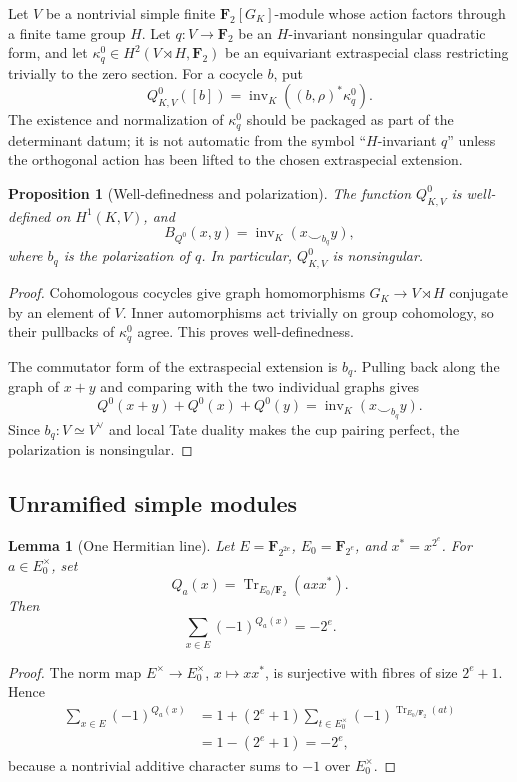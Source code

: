 \documentclass[11pt,reqno]{amsart}
\newtheorem{proposition}[theorem]{Proposition}
\newtheorem{lemma}[theorem]{Lemma}
\theoremstyle{remark}
\numberwithin{equation}{section}
\newcommand{\F}{\mathbf F}
\newcommand{\inv}{\operatorname{inv}}
\newcommand{\Tr}{\operatorname{Tr}}
\begin{document}
Let \(V\) be a nontrivial simple finite \(\F_2[G_K]\)-module whose action
factors through a finite tame group \(H\).  Let
\(q:V\to\F_2\) be an \(H\)-invariant nonsingular quadratic form, and let
\(\kappa_q^0\in H^2(V\rtimes H,\F_2)\) be an equivariant extraspecial
class restricting trivially to the zero section.  For a cocycle \(b\), put
\[
 Q^0_{K,V}([b])=\inv_K((b,\rho)^*\kappa_q^0).
\]
The existence and normalization of \(\kappa_q^0\) should be packaged as
part of the determinant datum; it is not automatic from the symbol
``\(H\)-invariant \(q\)'' unless the orthogonal action has been lifted to
the chosen extraspecial extension.

\begin{proposition}[Well-definedness and polarization]
\label{prop:local-polar}
The function \(Q^0_{K,V}\) is well-defined on \(H^1(K,V)\), and
\[
 B_{Q^0}(x,y)=\inv_K(x\smile_{b_q}y),
\]
where \(b_q\) is the polarization of \(q\).  In particular,
\(Q^0_{K,V}\) is nonsingular.
\end{proposition}

\begin{proof}
Cohomologous cocycles give graph homomorphisms
\(G_K\to V\rtimes H\) conjugate by an element of \(V\).  Inner
automorphisms act trivially on group cohomology, so their pullbacks of
\(\kappa_q^0\) agree.  This proves well-definedness.

The commutator form of the extraspecial extension is \(b_q\).  Pulling
back along the graph of \(x+y\) and comparing with the two individual
graphs gives
\[
 Q^0(x+y)+Q^0(x)+Q^0(y)=\inv_K(x\smile_{b_q}y).
\]
Since \(b_q:V\simeq V^\vee\) and local Tate duality makes the cup pairing
perfect, the polarization is nonsingular.
\end{proof}

\subsection{Unramified simple modules}

\begin{lemma}[One Hermitian line]\label{lem:hermitian-line}
Let \(E=\F_{2^{2e}}\), \(E_0=\F_{2^e}\), and
\(x^*=x^{2^e}\).  For \(a\in E_0^\times\), set
\[
 Q_a(x)=\Tr_{E_0/\F_2}(a x x^*).
\]
Then
\[
 \sum_{x\in E}(-1)^{Q_a(x)}=-2^e.
\]
\end{lemma}

\begin{proof}
The norm map \(E^\times\to E_0^\times\), \(x\mapsto xx^*\), is
surjective with fibres of size \(2^e+1\).  Hence
\[
\begin{aligned}
 \sum_{x\in E}(-1)^{Q_a(x)}
 &=1+(2^e+1)\sum_{t\in E_0^\times}
       (-1)^{\Tr_{E_0/\F_2}(at)}\\
 &=1-(2^e+1)=-2^e,
\end{aligned}
\]
because a nontrivial additive character sums to \(-1\) over
\(E_0^\times\).
\end{proof}
\end{document}
